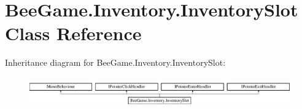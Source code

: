 \hypertarget{class_bee_game_1_1_inventory_1_1_inventory_slot}{}\section{Bee\+Game.\+Inventory.\+Inventory\+Slot Class Reference}
\label{class_bee_game_1_1_inventory_1_1_inventory_slot}
Inheritance diagram for Bee\+Game.\+Inventory.\+Inventory\+Slot\+:\begin{figure}[H]
\begin{center}
\leavevmode
\includegraphics[height=1.339713cm]{class_bee_game_1_1_inventory_1_1_inventory_slot}
\end{center}
\end{figure}
